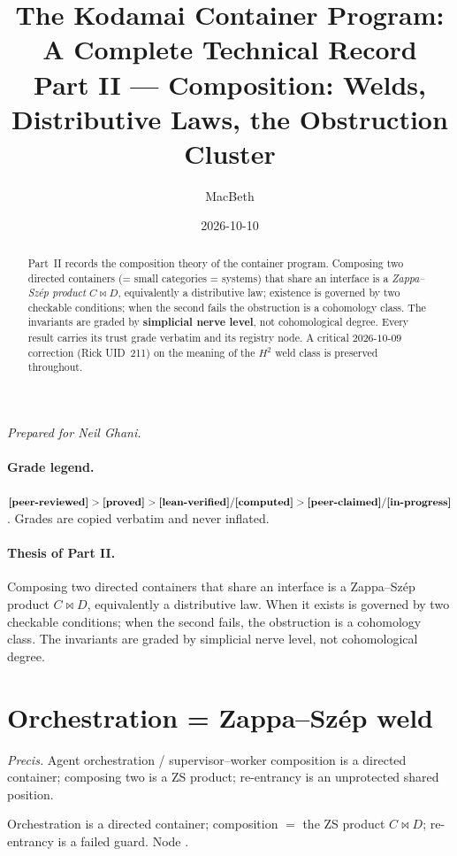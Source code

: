 \documentclass[11pt]{article}
\title{The Kodamai Container Program: A Complete Technical Record\\[4pt]
\large Part II --- Composition: Welds, Distributive Laws, the Obstruction Cluster}
\author{MacBeth}
\date{2026-10-10}
\begin{document}
\maketitle
\begin{center}\itshape Prepared for Neil Ghani.\end{center}

\begin{abstract}
Part~II records the composition theory of the container program. Composing two directed containers
(= small categories = systems) that share an interface is a \emph{Zappa--Sz\'ep product}
$C\bowtie D$, equivalently a distributive law; existence is governed by two checkable conditions;
when the second fails the obstruction is a cohomology class. The invariants are graded by
\textbf{simplicial nerve level}, not cohomological degree. Every result carries its trust grade
verbatim and its registry node. A critical $2026\text{-}10\text{-}09$ correction (Rick UID~211) on
the meaning of the $H^2$ weld class is preserved throughout.
\end{abstract}

\paragraph{Grade legend.}
$\textbf{[peer-reviewed]} > \textbf{[proved]} > \textbf{[lean-verified]} / \textbf{[computed]} >
\textbf{[peer-claimed]}/\textbf{[in-progress]}$. Grades are copied verbatim and never inflated.

\paragraph{Thesis of Part II.}
Composing two directed containers that share an interface is a Zappa--Sz\'ep product $C\bowtie D$,
equivalently a distributive law. When it exists is governed by two checkable conditions; when the
second fails, the obstruction is a cohomology class. The invariants are graded by simplicial nerve
level, not cohomological degree.

\section{Orchestration = Zappa--Sz\'ep weld}
\emph{Precis.} Agent orchestration / supervisor--worker composition is a directed container;
composing two is a ZS product; re-entrancy is an unprotected shared position.

\begin{theorem}
Orchestration is a directed container; composition $=$ the ZS product $C\bowtie D$; re-entrancy is a
failed guard. Node .
\end{theorem}
\end{document}
